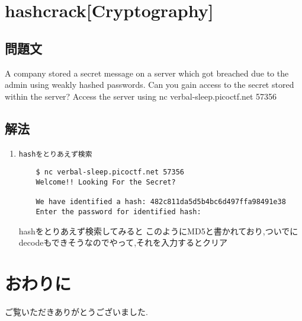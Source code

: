 \documentclass{jsarticle}
\begin{document}
\section{hashcrack[Cryptography]}
\subsection{問題文}
A company stored a secret message on a server which got breached due to the admin using weakly hashed passwords. Can you gain access to the secret stored within the server? Access the server using nc verbal-sleep.picoctf.net 57356

\subsection{解法}
\begin{enumerate}
	\item \texttt{hashをとりあえず検索}
	\begin{verbatim}
	$ nc verbal-sleep.picoctf.net 57356
	Welcome!! Looking For the Secret?

	We have identified a hash: 482c811da5d5b4bc6d497ffa98491e38
	Enter the password for identified hash: 
	\end{verbatim}
	hashをとりあえず検索してみると
	このようにMD5と書かれており,ついでにdecodeもできそうなのでやって,それを入力するとクリア

\end{enumerate}


\section{おわりに}
ご覧いただきありがとうございました.
\end{document}
